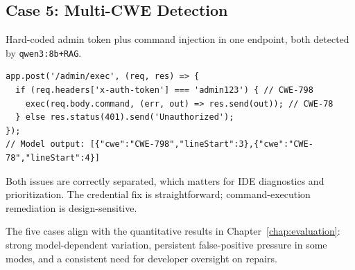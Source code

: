 \subsection{Case 5: Multi-CWE Detection}
\label{sec:case-multi-cwe}
Hard-coded admin token plus command injection in one endpoint, both detected by \texttt{qwen3:8b+RAG}.
\begin{lstlisting}[caption={Two findings from one handler (CWE-798 + CWE-78)}]
app.post('/admin/exec', (req, res) => {
  if (req.headers['x-auth-token'] === 'admin123') { // CWE-798
    exec(req.body.command, (err, out) => res.send(out)); // CWE-78
  } else res.status(401).send('Unauthorized');
});
// Model output: [{"cwe":"CWE-798","lineStart":3},{"cwe":"CWE-78","lineStart":4}]
\end{lstlisting}
Both issues are correctly separated, which matters for IDE diagnostics and prioritization. The credential fix is straightforward; command-execution remediation is design-sensitive.

The five cases align with the quantitative results in Chapter~\ref{chap:evaluation}: strong model-dependent variation, persistent false-positive pressure in some modes, and a consistent need for developer oversight on repairs.
